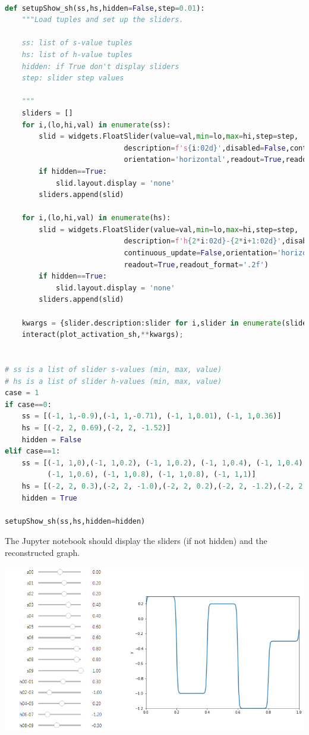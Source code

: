 \begin{lstlisting}[language=Python]
    
def setupShow_sh(ss,hs,hidden=False,step=0.01):
    """Load tuples and set up the sliders.
    
    ss: list of s-value tuples
    hs: list of h-value tuples
    hidden: if True don't display sliders
    step: slider step values
    
    """
    sliders = []
    for i,(lo,hi,val) in enumerate(ss):
        slid = widgets.FloatSlider(value=val,min=lo,max=hi,step=step,
                            description=f's{i:02d}',disabled=False,continuous_update=False,
                            orientation='horizontal',readout=True,readout_format='.2f')
        if hidden==True:
            slid.layout.display = 'none'
        sliders.append(slid)

    for i,(lo,hi,val) in enumerate(hs):
        slid = widgets.FloatSlider(value=val,min=lo,max=hi,step=step,
                            description=f'h{2*i:02d}-{2*i+1:02d}',disabled=False,
                            continuous_update=False,orientation='horizontal',
                            readout=True,readout_format='.2f')
        if hidden==True:
            slid.layout.display = 'none'
        sliders.append(slid)

    kwargs = {slider.description:slider for i,slider in enumerate(sliders)}
    interact(plot_activation_sh,**kwargs);

    
# ss is a list of slider s-values (min, max, value)
# hs is a list of slider h-values (min, max, value)
case = 1
if case==0:
    ss = [(-1, 1,-0.9),(-1, 1,-0.71), (-1, 1,0.01), (-1, 1,0.36)]
    hs = [(-2, 2, 0.69),(-2, 2, -1.52)]
    hidden = False
elif case==1:
    ss = [(-1, 1,0),(-1, 1,0.2), (-1, 1,0.2), (-1, 1,0.4), (-1, 1,0.4), (-1, 1,0.6), 
          (-1, 1,0.6), (-1, 1,0.8), (-1, 1,0.8), (-1, 1,1)]
    hs = [(-2, 2, 0.3),(-2, 2, -1.0),(-2, 2, 0.2),(-2, 2, -1.2),(-2, 2, -0.3)]
    hidden = True

setupShow_sh(ss,hs,hidden=hidden)    
\end{lstlisting}

The Jupyter notebook should display the sliders (if not hidden) and the reconstructed graph.

{\centering \includegraphics[width=\textwidth,]{pic/wigglyfn21} \par}


